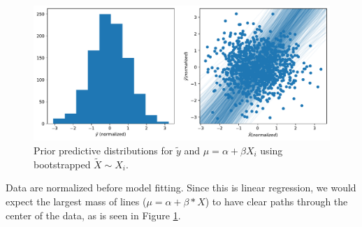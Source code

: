 \begin{figure}[H]
    \centering
    \includegraphics[width=0.8\linewidth]{data/05_reporting/problem_set_2/prior_predictive.pdf}
    \caption{Prior predictive distributions for $\tilde{y}$ and $\mu = \alpha + \beta X_i$ using bootstrapped $\tilde{X} \sim X_i$.}
    \label{fig:prior-predictive}
\end{figure}

Data are normalized before model fitting. Since this is linear regression, we would expect the largest mass of lines ($\mu = \alpha + \beta * X$) to have clear paths through the center of the data, as is seen in Figure \ref{fig:prior-predictive}.